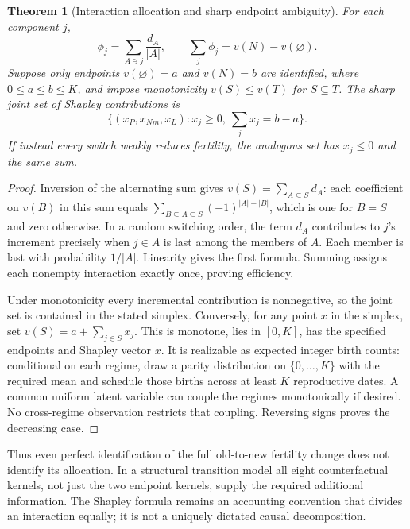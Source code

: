 \documentclass[11pt]{article}
\newtheorem{theorem}{Theorem}
\theoremstyle{remark}\newtheorem{remark}[theorem]{Remark}
\begin{document}
\begin{theorem}[Interaction allocation and sharp endpoint ambiguity]
For each component $j$,
\[
 \phi_j=\sum_{A\ni j}\frac{d_A}{|A|},\qquad
 \sum_j\phi_j=v(N)-v(\varnothing).
\]
Suppose only endpoints $v(\varnothing)=a$ and $v(N)=b$ are identified, where $0\le a\le b\le K$, and impose monotonicity $v(S)\le v(T)$ for $S\subseteq T$. The sharp joint set of Shapley contributions is
\[
 \{(x_P,x_{Nm},x_L):x_j\ge0,\ \sum_jx_j=b-a\}.
\]
If instead every switch weakly reduces fertility, the analogous set has $x_j\le0$ and the same sum.
\end{theorem}
\begin{proof}
Inversion of the alternating sum gives $v(S)=\sum_{A\subseteq S}d_A$: each coefficient on $v(B)$ in this sum equals $\sum_{B\subseteq A\subseteq S}(-1)^{|A|-|B|}$, which is one for $B=S$ and zero otherwise. In a random switching order, the term $d_A$ contributes to $j$'s increment precisely when $j\in A$ is last among the members of $A$. Each member is last with probability $1/|A|$. Linearity gives the first formula. Summing assigns each nonempty interaction exactly once, proving efficiency.

Under monotonicity every incremental contribution is nonnegative, so the joint set is contained in the stated simplex. Conversely, for any point $x$ in the simplex, set $v(S)=a+\sum_{j\in S}x_j$. This is monotone, lies in $[0,K]$, has the specified endpoints and Shapley vector $x$. It is realizable as expected integer birth counts: conditional on each regime, draw a parity distribution on $\{0,\ldots,K\}$ with the required mean and schedule those births across at least $K$ reproductive dates. A common uniform latent variable can couple the regimes monotonically if desired. No cross-regime observation restricts that coupling. Reversing signs proves the decreasing case.
\end{proof}

Thus even perfect identification of the full old-to-new fertility change does not identify its allocation. In a structural transition model all eight counterfactual kernels, not just the two endpoint kernels, supply the required additional information. The Shapley formula remains an accounting convention that divides an interaction equally; it is not a uniquely dictated causal decomposition.
\end{document}
